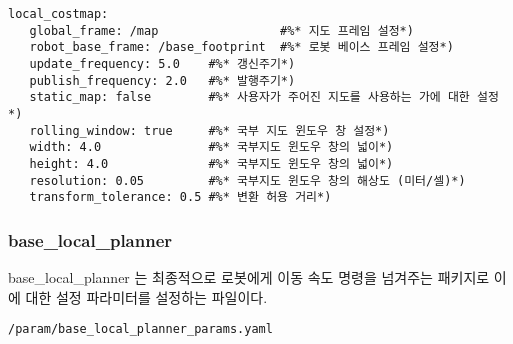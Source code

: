 \vspace{\baselineskip}
\begin{lstlisting}[language=ROS]
local_costmap:
   global_frame: /map                 #%* 지도 프레임 설정*)
   robot_base_frame: /base_footprint  #%* 로봇 베이스 프레임 설정*)
   update_frequency: 5.0    #%* 갱신주기*)
   publish_frequency: 2.0   #%* 발행주기*)
   static_map: false        #%* 사용자가 주어진 지도를 사용하는 가에 대한 설정*)
   rolling_window: true     #%* 국부 지도 윈도우 창 설정*)
   width: 4.0               #%* 국부지도 윈도우 창의 넓이*)
   height: 4.0              #%* 국부지도 윈도우 창의 넓이*)
   resolution: 0.05         #%* 국부지도 윈도우 창의 해상도 (미터/셀)*)
   transform_tolerance: 0.5 #%* 변환 허용 거리*)
\end{lstlisting}

\subsubsection{base\_local\_planner}
base\_local\_planner 는 최종적으로 로봇에게 이동 속도 명령을 넘겨주는 패키지로 이에 대한 설정 파라미터를 설정하는 파일이다.

\vspace{\baselineskip}
\begin{lstlisting}[language=ROS]
/param/base_local_planner_params.yaml
\end{lstlisting}

